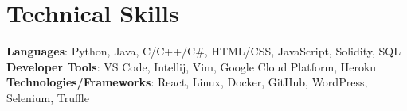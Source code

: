 \documentclass[letterpaper,11pt]{article}
\makeatletter
\newcommand{\resumeItem}[1]{
  \item\small{
    {#1 \vspace{-2pt}}
  }
}
\newcommand{\resumeSubheading}[4]{
  \vspace{-2pt}\item
    \begin{tabular*}{1.0\textwidth}[t]{l@{\extracolsep{\fill}}r}
      \textbf{#1} & \textbf{\small #2} \\
      \textit{\small#3} & \textit{\small #4} \\
    \end{tabular*}\vspace{-7pt}
}
\newcommand{\resumeSubHeadingListStart}{\begin{itemize}[leftmargin=0.0in, label={}]}
\newcommand{\resumeSubHeadingListEnd}{\end{itemize}}
\newcommand{\resumeItemListStart}{\begin{itemize}}
\newcommand{\resumeItemListEnd}{\end{itemize}\vspace{-5pt}}
\makeatother
\begin{document}
%
\section{Technical Skills}
 \begin{itemize}[leftmargin=0.15in, label={}]
    \small{\item{
     \textbf{Languages}{: Python, Java, C/C++/C\#, HTML/CSS, JavaScript, Solidity, SQL} \\
     \textbf{Developer Tools}{: VS Code, Intellij, Vim, Google Cloud Platform, Heroku}\\
     \textbf{Technologies/Frameworks}{: React, Linux, Docker, GitHub, WordPress, Selenium, Truffle} \\
    }}
 \end{itemize}
 \vspace{-16pt}


\begin{comment}
\section{Leadership / Extracurricular}
    \resumeSubHeadingListStart
        \resumeSubheading{ColorStack}{January 2020 -- May 2022}{President - Chapter Founder}{Carnegie Mellon University}
            \resumeItemListStart
                \resumeItem{Achieved a 4 star fraternity ranking by the Office of Fraternity and Sorority Affairs (highest possible ranking).}
                \resumeItem{Managed executive board of 5 members and ran weekly meetings to oversee progress in essential parts of the chapter.}
                \resumeItem{Led chapter of 30+ members to work towards goals that improve and promote community service, academics, and unity.}
            \resumeItemListEnd

        \resumeSubheading{ColorStack}{January 2020 -- May 2022}{President - Chapter Founder}{Carnegie Mellon University}
            \resumeItemListStart
                \resumeItem{Achieved a 4 star fraternity ranking by the Office of Fraternity and Sorority Affairs (highest possible ranking).}
                \resumeItem{Managed executive board of 5 members and ran weekly meetings to oversee progress in essential parts of the chapter.}
                \resumeItem{Led chapter of 30+ members to work towards goals that improve and promote community service, academics, and unity.}
            \resumeItemListEnd
        
    \resumeSubHeadingListEnd
\end{comment}
\end{document}
